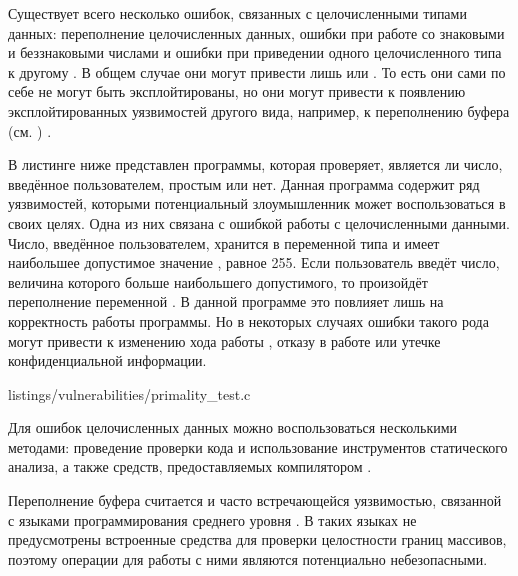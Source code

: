%
Существует всего несколько  ошибок, связанных с целочисленными типами данных: переполнение целочисленных данных, ошибки при работе со знаковыми и беззнаковыми числами и ошибки при приведении одного целочисленного типа к другому   
  . 
%
В общем случае они могут привести лишь  или . 
%
То есть они сами по себе не могут быть эксплойтированы, но они могут привести к появлению эксплойтированных уязвимостей другого вида, например, к переполнению буфера (см. ) . 

%
В листинге ниже представлен  программы, которая проверяет, является ли число, введённое пользователем, простым или нет. 
%
Данная программа содержит ряд уязвимостей, которыми потенциальный злоумышленник может воспользоваться в своих целях. 
%
Одна из них связана с ошибкой работы с целочисленными данными.
%
Число, введённое пользователем, хранится в переменной  типа  и имеет наибольшее допустимое значение , равное 255.
%
Если пользователь введёт число, величина которого больше наибольшего допустимого, то произойдёт переполнение переменной . 
%
В данной программе это повлияет лишь на корректность работы программы. 
%
Но в некоторых случаях ошибки такого рода могут привести к изменению хода работы , отказу в работе или утечке конфиденциальной информации.

\newpage
{}
	{listings/vulnerabilities/primality_test.c}
\newpage

%
Для  ошибок целочисленных данных можно воспользоваться несколькими методами: проведение проверки кода и использование инструментов статического анализа, а также средств, предоставляемых компилятором  .



%
Переполнение буфера считается  и часто встречающейся уязвимостью, связанной с языками программирования среднего уровня . 
%
В таких языках не предусмотрены встроенные средства для проверки целостности границ массивов, поэтому операции для работы с ними являются потенциально небезопасными. 

